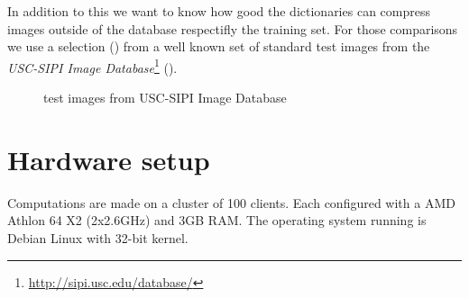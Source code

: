 In addition to this we want to know how good the dictionaries can compress
images outside of the database respectifly the training set. For
those comparisons we use a selection () from a
well known set of standard test images from the \emph{USC-SIPI Image
Database}\footnote{\url{http://sipi.usc.edu/database/}}
(). 
\begin{figure}[H]
\centering
\hspace{5mm}
\hspace{5mm}
\caption{test images from USC-SIPI Image Database}
\label{fig:USC-SIPI}
\end{figure}

\section{Hardware setup} 
Computations are made on a cluster of 100 clients. Each 
configured with a AMD Athlon 64 X2 (2x2.6GHz) and 3GB RAM.
The operating system running is Debian Linux with 32-bit kernel. 


